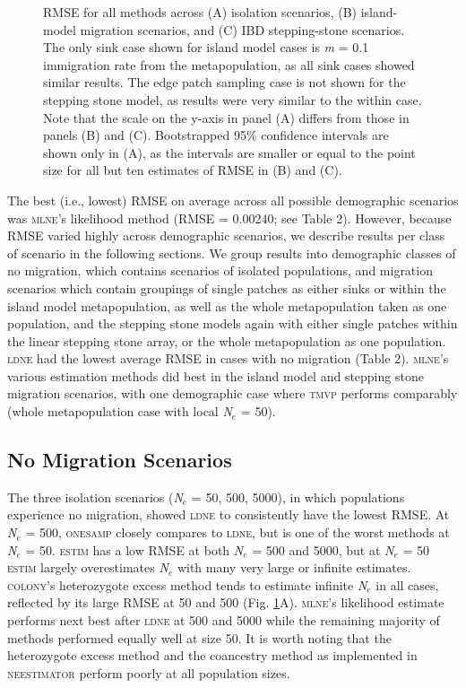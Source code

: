 \begin{figure}[]
\centering
{}
\caption{RMSE for all methods across (A) isolation scenarios, (B) island-model migration scenarios, and (C) 
IBD stepping-stone scenarios. The only sink case shown for island model cases is \emph{m} = 0.1 immigration rate from 
the metapopulation, as all sink cases showed similar results. The edge patch sampling case is not shown for 
the stepping stone model, as results were very similar to the within case. Note that the scale on the y-axis 
in panel (A) differs from those in panels (B) and (C). Bootstrapped 95\% confidence intervals are shown only 
in (A), as the intervals are smaller or equal to the point size for all but ten estimates of RMSE in (B) and (C).}
\label{fig:ne-2}
\end{figure}

The best (i.e., lowest) RMSE on average across all possible demographic scenarios was \textsc{mlne}'s 
likelihood method (RMSE = 0.00240; see Table 2). However, because RMSE varied highly across demographic 
scenarios, we describe results per class of scenario in the following sections. We group results 
into demographic classes of no migration, which contains scenarios of isolated populations, and 
migration scenarios which contain groupings of single patches as either sinks or within the island 
model metapopulation, as well as the whole metapopulation taken as one population, and the stepping 
stone models again with either single patches within the linear stepping stone array, or the whole 
metapopulation as one population. \textsc{ldne} had the lowest average RMSE in cases with no migration 
(Table 2). \textsc{mlne}'s various estimation methods did best in the island model and stepping stone 
migration scenarios, with one demographic case where \textsc{tmvp} performs comparably 
(whole metapopulation case with local \emph{N}$_e$ = 50).

\subsection{No Migration Scenarios}
The three isolation scenarios (\emph{N}$_e$ = 50, 500, 5000), in which populations experience 
no migration, showed \textsc{ldne} to consistently have the lowest RMSE. At \emph{N}$_e$ = 500, \textsc{onesamp} closely compares to 
\textsc{ldne}, but is one of the worst methods at \emph{N}$_e$ = 50. \textsc{estim} has a low RMSE 
at both \emph{N}$_e$ = 500 and 5000, but at \emph{N}$_e$ = 50 \textsc{estim} largely overestimates 
\emph{N}$_e$ with many very large or infinite estimates. \textsc{colony}'s heterozygote 
excess method tends to estimate infinite \emph{N}$_e$ in all cases, reflected by its 
large RMSE at 50 and 500 (Fig. \ref{fig:ne-2}A). \textsc{mlne}'s likelihood estimate performs next best 
after \textsc{ldne} at 500 and 5000 while the remaining majority of methods performed equally 
well at size 50. It is worth noting that the heterozygote excess method \citep{Pudovkin:1996} 
and the coancestry method \citep{Nomura:2008} as implemented in \textsc{neestimator} perform poorly at all population sizes.

